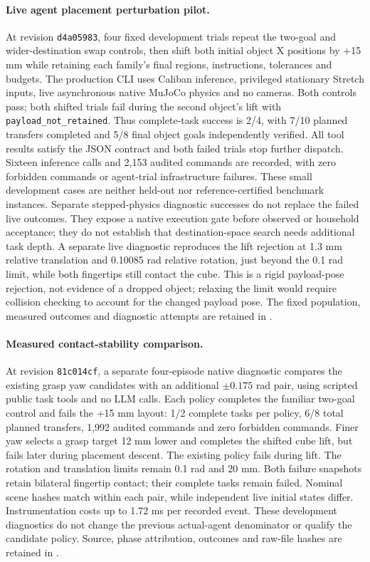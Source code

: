 \paragraph{Live agent placement perturbation pilot.}
At revision \texttt{d4a05983}, four fixed development trials repeat the two-goal
and wider-destination swap controls, then shift both initial object X positions
by +15 mm while retaining each family's final regions, instructions, tolerances
and budgets. The production CLI uses Caliban inference, privileged stationary
Stretch inputs, live asynchronous native MuJoCo physics and no cameras. Both
controls pass; both shifted trials fail during the second object's lift with
\texttt{payload\_not\_retained}. Thus complete-task success is 2/4, with 7/10
planned transfers completed and 5/8 final object goals independently verified.
All tool results satisfy the JSON contract and both failed trials stop further
dispatch. Sixteen inference calls and 2,153 audited commands are recorded, with
zero forbidden commands or agent-trial infrastructure failures. These small
development cases are neither held-out nor reference-certified benchmark
instances. Separate stepped-physics diagnostic successes do not replace the
failed live outcomes. They expose a native execution gate before observed or
household acceptance; they do not establish that destination-space search needs
additional task depth. A separate live diagnostic reproduces the lift rejection
at 1.3 mm relative translation and 0.10085 rad relative rotation, just beyond the
0.1 rad limit, while both fingertips still contact the cube. This is a rigid
payload-pose rejection, not evidence of a dropped object; relaxing the limit
would require collision checking to account for the changed payload pose.
The fixed population, measured outcomes and diagnostic
attempts are retained in
.

\paragraph{Measured contact-stability comparison.}
At revision \texttt{81c014cf}, a separate four-episode native diagnostic compares
the existing grasp yaw candidates with an additional $\pm0.175$ rad pair, using
scripted public task tools and no LLM calls. Each policy completes the familiar
two-goal control and fails the +15 mm layout: 1/2 complete tasks per policy,
6/8 total planned transfers, 1,992 audited commands and zero forbidden commands.
Finer yaw selects a grasp target 12 mm lower and completes the shifted cube lift,
but fails later during placement descent. The existing policy fails during lift.
The rotation and translation limits remain 0.1 rad and 20 mm. Both failure
snapshots retain bilateral fingertip contact; their complete tasks remain failed.
Nominal scene hashes match within each pair, while independent live initial
states differ. Instrumentation costs up to 1.72 ms per recorded event. These
development diagnostics do not change the previous actual-agent denominator or
qualify the candidate policy. Source, phase attribution, outcomes and raw-file
hashes are retained in
.

